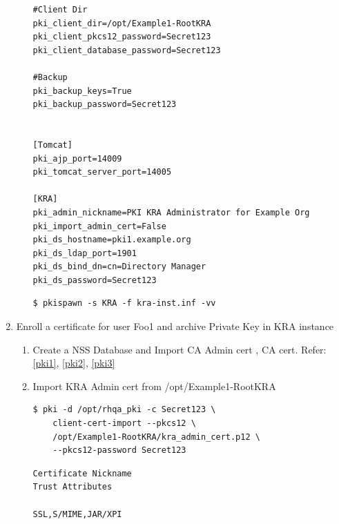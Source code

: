 \documentclass[a4paper]{article}
\begin{document}
\begin{enumerate}[label*=\arabic*.]
\begin{enumerate}[label*=\arabic*.]
\begin{lstlisting}[style=configFile]
#Client Dir
pki_client_dir=/opt/Example1-RootKRA
pki_client_pkcs12_password=Secret123
pki_client_database_password=Secret123

#Backup
pki_backup_keys=True
pki_backup_password=Secret123


[Tomcat]
pki_ajp_port=14009
pki_tomcat_server_port=14005

[KRA]
pki_admin_nickname=PKI KRA Administrator for Example Org
pki_import_admin_cert=False
pki_ds_hostname=pki1.example.org
pki_ds_ldap_port=1901
pki_ds_bind_dn=cn=Directory Manager
pki_ds_password=Secret123
                \end{lstlisting}
                \begin{lstlisting}[style=bashInputStyle]
$ pkispawn -s KRA -f kra-inst.inf -vv   
                \end{lstlisting}
            \end{enumerate}
        \item \label{arch_privatekey} Enroll a certificate for user Foo1 and archive Private Key in KRA instance
            \begin{enumerate}[label*=\arabic*.]
                \item Create a NSS Database and Import CA Admin cert , CA cert. Refer:\ref{pki1}, \ref{pki2}, \ref{pki3}
                \item Import KRA Admin cert from /opt/Example1-RootKRA
                    \begin{lstlisting}[style=bashInputStyle]
$ pki -d /opt/rhqa_pki -c Secret123 \
    client-cert-import --pkcs12 \
    /opt/Example1-RootKRA/kra_admin_cert.p12 \
    --pkcs12-password Secret123
                    \end{lstlisting}
                    \begin{lstlisting}
Certificate Nickname                                         Trust Attributes
                                                             SSL,S/MIME,JAR/XPI


\end{lstlisting}
\end{enumerate}
\end{enumerate}
\end{document}
